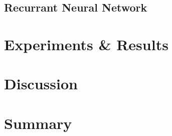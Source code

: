 \documentclass[10pt,conference,compsocconf]{IEEEtran}
\begin{document}
\subsection{Recurrant Neural Network}

\section{Experiments \& Results}
\label{sec:Experiments}

\section{Discussion}
\label{sec:Discussion}

\section{Summary}
\label{sec:Summary}





\end{document}
